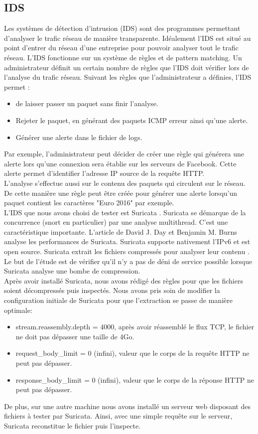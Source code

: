 \documentclass{svjour3}
\begin{document}
\subsection{IDS}
\label{2.3ids}
Les systèmes de détection d'intrusion (IDS) sont des programmes permettant d'analyser le trafic réseau de manière transparente. Idéalement l'IDS est situé au point d'entrer du réseau d'une entreprise pour pouvoir analyser tout le trafic réseau. L'IDS fonctionne sur un système de règles et de pattern matching. Un administrateur définit un certain nombre de règles que l'IDS doit vérifier lors de l'analyse du trafic réseau. Suivant les règles que l’administrateur a définies, l'IDS permet :
\begin{itemize}
\item de laisser passer un paquet sans finir l'analyse.
\item Rejeter le paquet, en générant des paquets ICMP erreur ainsi qu'une alerte.
\item Générer une alerte dans le fichier de logs.
\end{itemize} 
Par exemple, l'administrateur peut décider de créer une règle  qui générera une alerte lors qu'une connexion sera établie sur les serveurs de Facebook. Cette alerte permet d'identifier l'adresse IP source de la requête HTTP.\\
L'analyse s'effectue aussi sur le contenu des paquets qui circulent sur le réseau. De cette manière une règle peut être créée pour générer une alerte lorsqu'un paquet contient les caractères "Euro 2016" par exemple.\\
L'IDS que nous avons choisi de tester est Suricata \cite{Suricata}. Suricata se démarque de la concurrence (snort en particulier) par une analyse multithread. C'est une caractéristique importante. L'article de David J. Day et Benjamin M. Burns \cite{PerformanceAnalysis}  analyse les performances de Suricata. Suricata supporte nativement l'IPv6 et est open source. Suricata extrait les fichiers compressés pour analyser leur contenu \cite{SuricataExtraction}. Le but de l’étude est de vérifier qu'il n'y a pas de déni de service possible lorsque Suricata analyse une bombe de compression.\\
Après avoir installé Suricata, nous avons rédigé des règles pour que les fichiers soient décompressés puis inspectés. Nous avons pris soin de modifier la configuration initiale de Suricata pour que l'extraction se passe de manière optimale:
\begin{itemize}
\item stream.reassembly.depth = 4000, après avoir réassemblé le flux TCP, le fichier ne doit pas dépasser une taille de 4Go.
\item request\_body\_limit = 0 (infini), valeur que le corps de la requête HTTP ne peut pas dépasser.
\item response\_body\_limit = 0 (infini), valeur que le corps de la réponse HTTP ne peut pas dépasser.
\end{itemize}
De plus, sur une autre machine nous avons installé un serveur web disposant des fichiers à tester par Suricata. Ainsi, avec une simple requête sur le serveur, Suricata reconstitue le fichier puis l'inspecte.
\end{document}
